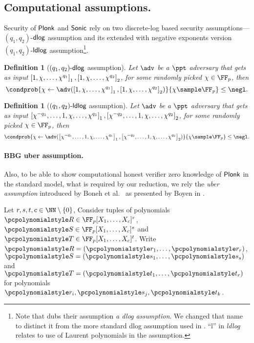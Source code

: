 \let\accentvec\vec \documentclass[runningheads]{llncs}
\newtheorem{definition}[theorem]{Definition}
\begin{document}
\subsection{Computational assumptions.}
Security of $\textnormal{\textsf{Plonk}}$ and ${\textnormal{\textsf{Sonic}}}$ rely on two discrete-log based security
assumptions---$(q_1, q_2)$-$\mathsf{dlog}$ assumption and its extended with
negative exponents version $(q_1,
q_2)$-$\mathsf{ldlog}$ assumption\footnote{Note that \cite{CCS:MBKM19} dubs their
	assumption \emph{a dlog assumption}. We changed that name to distinct it
from the more standard dlog assumption used in \cite{EPRINT:GabWilCio19}.
``l'' in \emph{ldlog} relates to use of Laurent polynomials in the assumption.}.
\begin{definition}[$(q_1, q_2)\text{-}\mathsf{dlog}$ assumption]
	Let $\adv$ be a $\ppt$ adversary that gets as input $\left[1, \chi, \ldots, \chi^{q_1}\right]_{1}, \left[1, \chi, \ldots, \chi^{q_2}\right]_{2}$, for some randomly picked $\chi \in \FF_p$, then
	\[
		\condprob{\chi \gets \adv(\gone{1, \chi, \ldots, \chi^{q_1}}, \gtwo{1, \chi, \ldots, \chi^{q_2} })}{\chi \sample \FF_p} \leq \negl.
	\]
\end{definition}

\begin{definition}[$(q_1, q_2)\text{-}\mathsf{ldlog}$ assumption]
		Let $\adv$ be a $\ppt$ adversary that gets as input $\left[\chi^{-q_1},
		\ldots, 1, \chi, \ldots, \chi^{q_1}\right]_{1}, \left[\chi^{-q_2}, \ldots, 1, \chi, \ldots, \chi^{q_2}\right]_{2}$, for some randomly picked $\chi \in \FF_p$, then
	\[
			\condprob{\chi \gets \adv(\gone{\chi^{-q_1}, \ldots, 1, \chi, \ldots,
			\chi^{q_1}}, \gtwo{\chi^{-q_2}, \ldots, 1, \chi, \ldots, \chi^{q_2} })}{\chi \sample \FF_p} \leq \negl.
	\]
\end{definition}

\paragraph{BBG uber assumption.}
Also, to be able to show computational honest verifier zero knowledge of
$\textnormal{\textsf{Plonk}}$ in the standard model, what is required by our reduction, we rely the
\emph{uber assumption} introduced by Boneh et
al.~\cite{EC:BonBoyGoh05} as presented by Boyen in \cite{PAIRING:Boyen08}.

Let $r, s, t, c \in \NN \setminus \smallset{0}$, Consider tuples of
polynomials $\pR
\in \FF_p[X_1, \ldots, X_c]^r$, $\pS \in \FF_p[X_1, \ldots, X_c]^s$ and
$\pT 
\in \FF_p[X_1, \ldots, X_c]^t$. Write $\pR = \left( \p{r}_1, \ldots,
\p{r}_r \right)$,
$\pS = \left( \p{s}_1, \ldots, \p{s}_s \right)$ and $\pT = \left( \p{t}_1, \ldots,
\p{t}_r \right)$ for polynomials $\p{r}_i, \p{s}_j, \p{t}_k$. 
\end{document}
